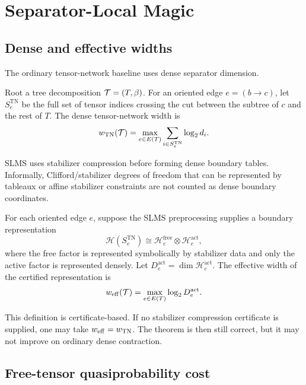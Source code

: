\section{Separator-Local Magic}
\label{sec:sep-local}

\subsection{Dense and effective widths}

The ordinary tensor-network baseline uses dense separator dimension.

\begin{definition}
Root a tree decomposition \(\mathcal{T}=(T,\beta)\). For an oriented edge \(e=(b\to c)\), let \(S_e^{\mathrm{TN}}\) be the full set of tensor indices crossing the cut between the subtree of \(c\) and the rest of \(T\). The dense tensor-network width is
\[
w_{\mathrm{TN}}(\mathcal{T})=\max_{e\in E(T)}\sum_{i\in S_e^{\mathrm{TN}}}\log_2 d_i .
\]
\end{definition}

SLMS uses stabilizer compression before forming dense boundary tables. Informally, Clifford/stabilizer degrees of freedom that can be represented by tableaux or affine stabilizer constraints are not counted as dense boundary coordinates.

\begin{definition}
For each oriented edge \(e\), suppose the SLMS preprocessing supplies a boundary representation
\[
\mathcal H(S_e^{\mathrm{TN}})
\cong
\mathcal H_e^{\mathrm{free}}\otimes \mathcal H_e^{\mathrm{act}},
\]
where the free factor is represented symbolically by stabilizer data and only the active factor is represented densely. Let \(D_e^{\mathrm{act}}=\dim \mathcal H_e^{\mathrm{act}}\). The effective width of the certified representation is
\[
w_{\mathrm{eff}}(\mathcal{T})=\max_{e\in E(T)}\log_2 D_e^{\mathrm{act}}.
\]
\end{definition}

This definition is certificate-based. If no stabilizer compression certificate is supplied, one may take \(w_{\mathrm{eff}}=w_{\mathrm{TN}}\). The theorem is then still correct, but it may not improve on ordinary dense contraction.

\subsection{Free-tensor quasiprobability cost}

